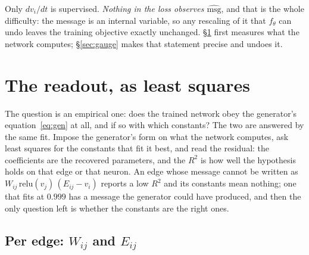 \documentclass[11pt,a4paper]{article}
\newcommand{\vj}{v_j}
\newcommand{\vi}{v_i}
\newcommand{\Wij}{W_{ij}}
\newcommand{\Eij}{E_{ij}}
\newcommand{\msg}{\mathrm{msg}}
\newcommand{\act}{\mathrm{relu}}
\begin{document}
Only $d\vi/dt$ is supervised. \emph{Nothing in the loss observes
$\widehat{\msg}$}, and that is the whole difficulty: the message is an internal
variable, so any rescaling of it that $f_\theta$ can undo leaves the training
objective exactly unchanged. \S\ref{sec:readout} first measures what the network
computes; \S\ref{sec:gauge} makes that statement precise and undoes it.

\section{The readout, as least squares}
\label{sec:readout}

The question is an empirical one: does the trained network obey the generator's
equation~\eqref{eq:gen} at all, and if so with which constants? The two are answered by the same fit. Impose the
generator's form on what the network computes, ask least squares for the
constants that fit it best, and read the residual: the coefficients are the
recovered parameters, and the $R^2$ is how well the hypothesis holds on that edge
or that neuron. An edge whose message cannot be written as
$\Wij\,\act(\vj)\,(\Eij-\vi)$ reports a low $R^2$ and its constants mean nothing;
one that fits at $0.999$ has a message the generator could have produced, and
then the only question left is whether the constants are the right ones.


\subsection{Per edge: $\Wij$ and $\Eij$}
\label{sec:edge}
\end{document}
